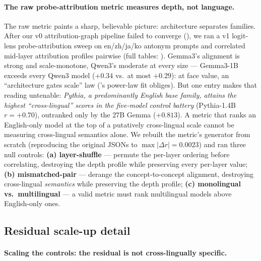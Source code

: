 \paragraph{The raw probe-attribution metric measures depth, not language.}

The raw metric paints a sharp, believable picture: architecture separates families. After
our v0 attribution-graph pipeline failed to converge (), we ran a v1
logit-lens probe-attribution sweep on en/zh/ja/ko antonym prompts and correlated mid-layer
attribution profiles pairwise (full tables: ).
Gemma3's alignment is strong and scale-monotone, Qwen3's moderate at every size ---
Gemma3-1B exceeds every Qwen3 model ($+0.34$ vs.\ at most $+0.29$): at face value, an
``architecture gates scale'' law ('s power-law fit obliges). But one entry makes that reading untenable: \emph{Pythia, a predominantly
English base family, attains the highest ``cross-lingual'' scores in the five-model control
battery} (Pythia-1.4B $r=+0.70$), outranked only by the 27B Gemma ($+0.813$). A metric that
ranks an English-only model at the top of a putatively
cross-lingual scale cannot be measuring cross-lingual semantics alone. We rebuilt the
metric's generator from scratch (reproducing the original JSONs to
$\max|\Delta r|=0.0023$) and ran three null controls:
\textbf{(a) layer-shuffle} --- permute the per-layer ordering before correlating, destroying
the depth profile while preserving every per-layer value; \textbf{(b) mismatched-pair} ---
derange the concept-to-concept alignment, destroying cross-lingual \emph{semantics} while
preserving the depth profile; \textbf{(c) monolingual vs.\ multilingual} --- a valid metric
must rank multilingual models above English-only ones.



\subsection{Residual scale-up detail}\label{app:residual-scale-detail}
\paragraph{Scaling the controls: the residual is not cross-lingually specific.}

